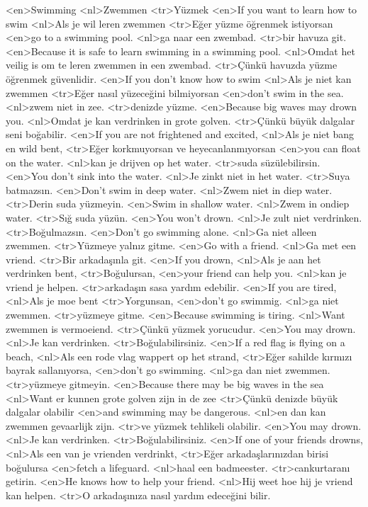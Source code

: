 <en>Swimming
<nl>Zwemmen
<tr>Yüzmek
<en>If you want to learn how to swim
<nl>Als je wil leren zwemmen
<tr>Eğer yüzme öğrenmek istiyorsan
<en>go to a swimming pool.
<nl>ga naar een zwembad.
<tr>bir havuza git.
<en>Because it  is safe to learn swimming  in a swimming pool.
<nl>Omdat het veilig is om te leren zwemmen in een zwembad.
<tr>Çünkü havuzda yüzme öğrenmek güvenlidir.
<en>If you don’t know how to swim
<nl>Als je niet kan zwemmen
<tr>Eğer nasıl yüzeceğini bilmiyorsan
<en>don’t swim in the sea.
<nl>zwem niet in zee.
<tr>denizde yüzme.
<en>Because big waves may drown you.
<nl>Omdat je kan verdrinken in grote golven.
<tr>Çünkü büyük dalgalar seni boğabilir.
<en>If you are not frightened and excited,
<nl>Als je niet bang en wild bent,
<tr>Eğer korkmuyorsan ve heyecanlanmıyorsan
<en>you can float on the water.
<nl>kan je drijven op het water.
<tr>suda süzülebilirsin.
<en>You don’t sink into the water.
<nl>Je zinkt niet in het water.
<tr>Suya batmazsın.
<en>Don’t swim in deep water.
<nl>Zwem niet in diep water.
<tr>Derin suda yüzmeyin.
<en>Swim in shallow water.
<nl>Zwem in ondiep water.
<tr>Sığ suda yüzün.
<en>You won’t  drown.
<nl>Je zult niet verdrinken.
<tr>Boğulmazsın.
<en>Don’t go swimming alone.
<nl>Ga niet alleen zwemmen.
<tr>Yüzmeye yalnız gitme.
<en>Go with a friend.
<nl>Ga met een vriend.
<tr>Bir arkadaşınla git.
<en>If you  drown,
<nl>Als je aan het verdrinken bent,
<tr>Boğulursan,
<en>your friend can help you.
<nl>kan je vriend je helpen.
<tr>arkadaşın sasa yardım edebilir.
<en>If you are tired,
<nl>Als je moe bent
<tr>Yorgunsan,
<en>don’t go swimmig.
<nl>ga niet zwemmen.
<tr>yüzmeye gitme.
<en>Because swimming is tiring.
<nl>Want zwemmen is vermoeiend.
<tr>Çünkü yüzmek yorucudur.
<en>You may drown.
<nl>Je kan verdrinken.
<tr>Boğulabilirsiniz.
<en>If a red flag is flying on a beach,
<nl>Als een rode vlag wappert op het strand,
<tr>Eğer sahilde kırmızı bayrak sallanıyorsa,
<en>don’t go swimming.
<nl>ga dan niet zwemmen.
<tr>yüzmeye gitmeyin.
<en>Because there may be big waves in the sea
<nl>Want er kunnen grote golven zijn in de zee
<tr>Çünkü denizde büyük dalgalar olabilir
<en>and swimming may be dangerous.
<nl>en dan kan zwemmen gevaarlijk zijn.
<tr>ve yüzmek tehlikeli olabilir.
<en>You may drown.
<nl>Je kan verdrinken.
<tr>Boğulabilirsiniz.
<en>If one of your friends drowns,
<nl>Als een van je vrienden verdrinkt,
<tr>Eğer arkadaşlarınızdan birisi boğulursa
<en>fetch a lifeguard.
<nl>haal een badmeester.
<tr>cankurtaranı getirin.
<en>He knows how to help your friend.
<nl>Hij weet hoe hij je vriend kan helpen.
<tr>O arkadaşınıza nasıl yardım edeceğini bilir.
